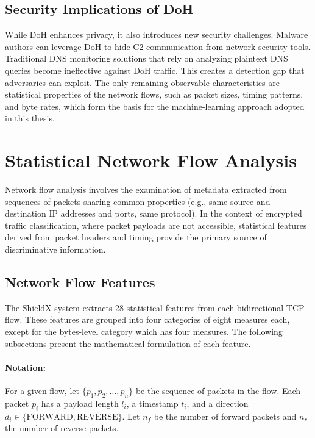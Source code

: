 \documentclass[../Main.tex]{subfiles}
\begin{document}
\subsection{Security Implications of DoH}

While DoH enhances privacy, it also introduces new security challenges. Malware authors can leverage DoH to hide C2 communication from network security tools. Traditional DNS monitoring solutions that rely on analyzing plaintext DNS queries become ineffective against DoH traffic. This creates a detection gap that adversaries can exploit. The only remaining observable characteristics are statistical properties of the network flows, such as packet sizes, timing patterns, and byte rates, which form the basis for the machine-learning approach adopted in this thesis.

\section{Statistical Network Flow Analysis}
\label{section:3.2}

Network flow analysis involves the examination of metadata extracted from sequences of packets sharing common properties (e.g., same source and destination IP addresses and ports, same protocol). In the context of encrypted traffic classification, where packet payloads are not accessible, statistical features derived from packet headers and timing provide the primary source of discriminative information.

\subsection{Network Flow Features}

The ShieldX system extracts 28 statistical features from each bidirectional TCP flow. These features are grouped into four categories of eight measures each, except for the bytes-level category which has four measures. The following subsections present the mathematical formulation of each feature.

\paragraph{Notation:} For a given flow, let $\{p_1, p_2, \ldots, p_n\}$ be the sequence of packets in the flow. Each packet $p_i$ has a payload length $l_i$, a timestamp $t_i$, and a direction $d_i \in \{\text{FORWARD}, \text{REVERSE}\}$. Let $n_f$ be the number of forward packets and $n_r$ the number of reverse packets.
\end{document}
